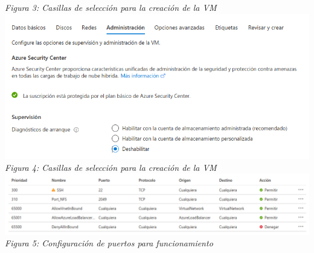 \documentclass[10pt,executivepaper]{article}
\begin{document}
\begin{center}
  \textit{Figura 3: Casillas de selección para la creación de la VM}\\
  \includegraphics[scale=0.5]{imgs/creacion_4.png}\\
  \textit{Figura 4: Casillas de selección para la creación de la VM}\\
  \includegraphics[scale=0.4]{imgs/conf_ports.png}\\
  \textit{Figura 5: Configuración de puertos para funcionamiento}
\end{center}
\end{document}
